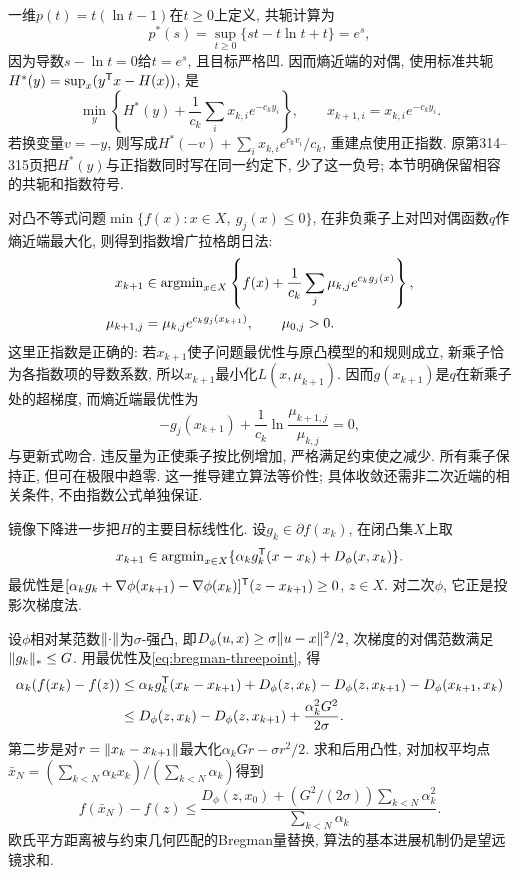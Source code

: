一维$p(t)=t(\ln t-1)$在$t\ge0$上定义, 共轭计算为
\[
 p^*(s)=\sup_{t\ge0}\{st-t\ln t+t\}=e^s,
\]
因为导数$ s-\ln t=0$给$t=e^s$, 且目标严格凹. 因而熵近端的对偶, 使用标准共轭$H^*(y)=\sup_x(y^{\mathsf T} x-H(x))$, 是
\begin{equation}\label{eq:entropy-prox-dual}
 \min_y\left\{H^*(y)+\frac1{c_k}\sum_i x_{k,i}e^{-c_k y_i}\right\},\qquad
 x_{k+1,i}=x_{k,i}e^{-c_k y_i}.
\end{equation}
若换变量$v=-y$, 则写成$H^*(-v)+\sum_i x_{k,i}e^{c_kv_i}/c_k$, 重建点使用正指数. 原第314--315页把$H^*(y)$与正指数同时写在同一约定下, 少了这一负号; 本节明确保留相容的共轭和指数符号.

对凸不等式问题$\min\{f(x):x\in X,\ g_j(x)\le0\}$, 在非负乘子上对凹对偶函数$q$作熵近端最大化, 则得到指数增广拉格朗日法:
\begin{equation}\label{eq:exponential-alm}
 \begin{split}
 x_{k+1}&\in\operatorname{argmin}_{x\in X}\left\{f(x)+\frac1{c_k}\sum_j\mu_{k,j}e^{c_k g_j(x)}\right\},\\
 \mu_{k+1,j}&=\mu_{k,j}e^{c_k g_j(x_{k+1})},\qquad\mu_{0,j}>0.
 \end{split}
\end{equation}
这里正指数是正确的: 若$x_{k+1}$使子问题最优性与原凸模型的和规则成立, 新乘子恰为各指数项的导数系数, 所以$x_{k+1}$最小化$L(x,\mu_{k+1})$. 因而$g(x_{k+1})$是$q$在新乘子处的超梯度, 而熵近端最优性为
\[
 -g_j(x_{k+1})+\frac1{c_k}\ln\frac{\mu_{k+1,j}}{\mu_{k,j}}=0,
\]
与更新式吻合. 违反量为正使乘子按比例增加, 严格满足约束使之减少. 所有乘子保持正, 但可在极限中趋零. 这一推导建立算法等价性; 具体收敛还需非二次近端的相关条件, 不由指数公式单独保证.

镜像下降进一步把$H$的主要目标线性化. 设$g_k\in\partial f(x_k)$, 在闭凸集$X$上取
\[
 x_{k+1}\in\operatorname{argmin}_{x\in X}\{\alpha_k g_k^{\mathsf T}(x-x_k)+D_\phi(x,x_k)\}.
\]
最优性是$[\alpha_k g_k+\nabla\phi(x_{k+1})-\nabla\phi(x_k)]^{\mathsf T}(z-x_{k+1})\ge0$, $z\in X$. 对二次$\phi$, 它正是投影次梯度法.

设$\phi$相对某范数$\lVert \cdot\rVert$为$\sigma$-强凸, 即$D_\phi(u,x)\ge\sigma\lVert u-x\rVert^2/2$, 次梯度的对偶范数满足$\lVert g_k\rVert_*\le G$. 用最优性及\eqref{eq:bregman-threepoint}, 得
\begin{align*}
 \alpha_k(f(x_k)-f(z))
 &\le\alpha_k g_k^{\mathsf T}(x_k-x_{k+1})
   +D_\phi(z,x_k)-D_\phi(z,x_{k+1})-D_\phi(x_{k+1},x_k)\\
 &\le D_\phi(z,x_k)-D_\phi(z,x_{k+1})+\frac{\alpha_k^2G^2}{2\sigma}.
\end{align*}
第二步是对$r=\lVert x_k-x_{k+1}\rVert$最大化$\alpha_kGr-\sigma r^2/2$. 求和后用凸性, 对加权平均点$\bar x_N=(\sum_{k<N}\alpha_kx_k)/(\sum_{k<N}\alpha_k)$得到
\begin{equation}\label{eq:mirror-rate}
 f(\bar x_N)-f(z)\le
 \frac{D_\phi(z,x_0)+(G^2/(2\sigma))\sum_{k<N}\alpha_k^2}{\sum_{k<N}\alpha_k}.
\end{equation}
欧氏平方距离被与约束几何匹配的Bregman量替换, 算法的基本进展机制仍是望远镜求和.

